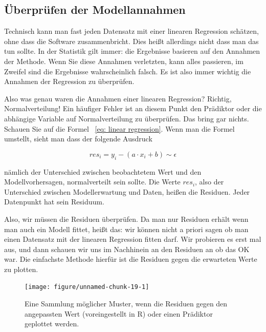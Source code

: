 \documentclass[a4paper,twoside]{tufte-book}\usepackage[]{graphicx}\usepackage[]{color}
\begin{document}
\subsection{Überprüfen der Modellannahmen}

Technisch kann man fast jeden Datensatz mit einer linearen Regression schätzen, ohne dass die Software zusammenbricht. Dies heißt allerdings nicht dass man das tun sollte. In der Statistik gilt immer: die Ergebnisse basieren auf den Annahmen der Methode. Wenn Sie diese Annahmen verletzten, kann alles passieren, im Zweifel sind die Ergebnisse wahrscheinlich falsch. Es ist also immer wichtig die Annahmen der Regression zu überprüfen.

Also was genau waren die Annahmen einer linearen Regression? Richtig, Normalverteilung! Ein häufiger Fehler ist an diesem Punkt den Prädiktor oder die abhängige Variable auf Normalverteilung zu überprüfen. Das bring gar nichts. Schauen Sie auf die Formel ~\ref{eq: linear regression}. Wenn man die Formel umstellt, sieht man dass der folgende Ausdruck

\begin{equation} \label{eq: residuals}
res_i = y_i - (a \cdot x_i + b ) \sim \epsilon 
\end{equation}

nämlich der Unterschied zwischen beobachtetem Wert und den Modellvorhersagen, normalverteilt sein sollte. Die Werte $res_i$, also der Unterschied zwischen Modellerwartung und Daten, heißen die Residuen. Jeder Datenpunkt hat sein Residuum. 

Also, wir müssen die Residuen überprüfen. Da man nur Residuen erhält wenn man auch ein Modell fittet, heißt das: wir können nicht a priori sagen ob man einen Datensatz mit der linearen Regression fitten darf. Wir probieren es erst mal aus, und dann schauen wir uns im Nachhinein an den Residuen an ob das OK war. Die einfachste Methode hierfür ist die Residuen gegen die erwarteten Werte zu plotten. 



\begin{figure}[htbp]
\begin{center}
\begin{Schunk}

\texttt{[image: figure/unnamed-chunk-19-1]} \end{Schunk}
\caption{Eine Sammlung möglicher Muster, wenn die Residuen gegen den angepassten Wert (voreingestellt in R) oder einen Prädiktor geplottet werden.}
\label{fig: ResidualPatterns}
\end{center}
\end{figure}
\end{document}

